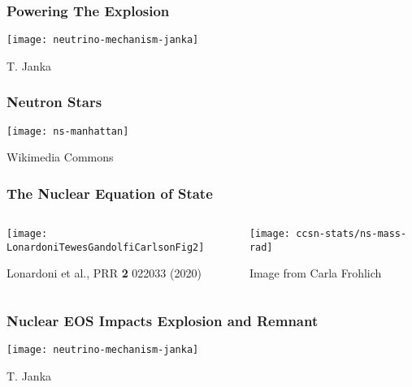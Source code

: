 \documentclass[]{beamer}
\begin{document}
\begin{frame}
  \frametitle{Powering The Explosion}
  \begin{center}
    \texttt{[image: neutrino-mechanism-janka]}
  \end{center}
  T. Janka
\end{frame}

\begin{frame}
  \frametitle{Neutron Stars}
  \begin{center}
    \texttt{[image: ns-manhattan]}
  \end{center}
  Wikimedia Commons
\end{frame}

\begin{frame}
  \frametitle{The Nuclear Equation of State}
  \begin{columns}
    \begin{column}{6cm}
      \begin{center}
        \texttt{[image: LonardoniTewesGandolfiCarlsonFig2]}
      \end{center}
      Lonardoni et al., PRR \textbf{2} 022033 (2020)
    \end{column}
    \begin{column}{6cm}
      \begin{center}
        \texttt{[image: ccsn-stats/ns-mass-rad]}
      \end{center}
      Image from Carla Frohlich
    \end{column}
  \end{columns}
\end{frame}

\begin{frame}
  \frametitle{Nuclear EOS Impacts Explosion and Remnant}
  \begin{center}
    \texttt{[image: neutrino-mechanism-janka]}
  \end{center}
  T. Janka
\end{frame}
\end{document}
